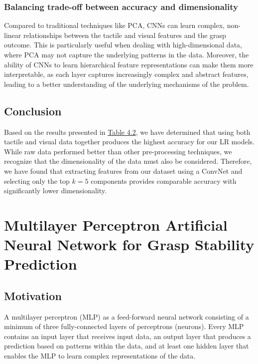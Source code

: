 \documentclass[11pt, a4paper]{report}
\begin{document}
\subsection{Balancing trade-off between accuracy and dimensionality}
\label{sec:4.5.1}
Compared to traditional techniques like PCA, CNNs can learn complex, non-linear relationships between the tactile and visual features and the grasp outcome. This is particularly useful when dealing with high-dimensional data, where PCA may not capture the underlying patterns in the data. Moreover, the ability of CNNs to learn hierarchical feature representations can make them more interpretable, as each layer captures increasingly complex and abstract features, leading to a better understanding of the underlying mechanisms of the problem.


\section{Conclusion}
\label{sec:4.6}
Based on the results presented in \hyperref[tbl:4.2]{Table 4.2}, we have determined that using both tactile and visual data together produces the highest accuracy for our LR models. While raw data performed better than other pre-processing techniques, we recognize that the dimensionality of the data must also be considered. Therefore, we have found that extracting features from our dataset using a ConvNet and selecting only the top $k=5$ components provides comparable accuracy with significantly lower dimensionality.


\chapter{Multilayer Perceptron Artificial Neural Network for Grasp Stability Prediction}
\label{chap:5}

\section{Motivation}
\label{sec:5.1}
A multilayer perceptron (MLP) as a feed-forward neural network consisting of a minimum of three fully-connected layers of perceptrons (neurons). Every MLP contains an input layer that receives input data, an output layer that produces a prediction based on patterns within the data, and at least one hidden layer that enables the MLP to learn complex representations of the data.\\
\end{document}
